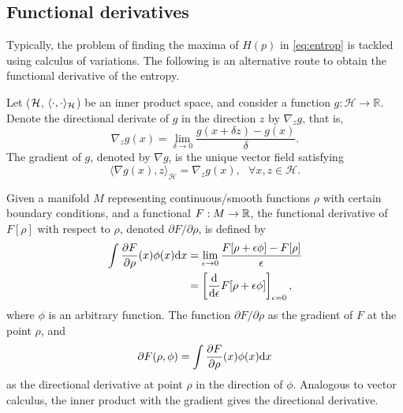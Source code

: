 \subsection{Functional derivatives}

Typically, the problem of finding the maxima of $H(p)$ in \cref{eq:entrop} is tackled using calculus of variations.
The following is an alternative route to obtain the functional derivative of the entropy.

\begin{definition}
  Let (${\mathcal H}$, $\langle\cdot,\cdot\rangle_{\mathcal H}$) be an inner product space, and consider a function $g:\mathcal H \rightarrow \mathbb R$. 
  Denote the directional derivate of $g$ in the direction $z$ by $\nabla_z g$, that is, 
	\[
		\nabla_z g(x) = \lim_{\delta \rightarrow 0} \frac{g(x + \delta z) - g(x)}{\delta}.
	\]
	The gradient of $g$, denoted by $\nabla g$, is the unique vector field satisfying 
	\[
		\langle \nabla g(x), z \rangle_{\mathcal H} = \nabla_z g(x), \ \ \ \forall x,z \in \mathcal H.
	\]
\end{definition}

\begin{definition}
  Given a manifold $M$ representing continuous/smooth functions $\rho$ with certain boundary conditions, and a functional $F:M\to\mathbb{R}$, the functional derivative of $F[\rho]$ with respect to $\rho$, denoted $\partial F/\partial\rho$, is defined by
  \begin{align*}
    \int \frac{\partial F}{\partial\rho}(x)\phi(x)\text{d} x
    &= \lim_{\epsilon\to 0} \frac{F[\rho + \epsilon\phi] - F[\rho]}{\epsilon} \\
    &= \left[ \frac{\text{d}}{\text{d} \epsilon} F[\rho + \epsilon\phi] \right]_{\epsilon=0},
  \end{align*}
  where $\phi$ is an arbitrary function.
  The function $\partial F/\partial\rho$ as the gradient of $F$ at the point $\rho$, and
  \[
    \partial F(\rho,\phi) = \int \frac{\partial F}{\partial\rho}(x)\phi(x) \text{d} x
  \]
  as the directional derivative at point $\rho$ in the direction of $\phi$.
  Analogous to vector calculus, the inner product with the gradient gives the directional derivative.
\end{definition}

